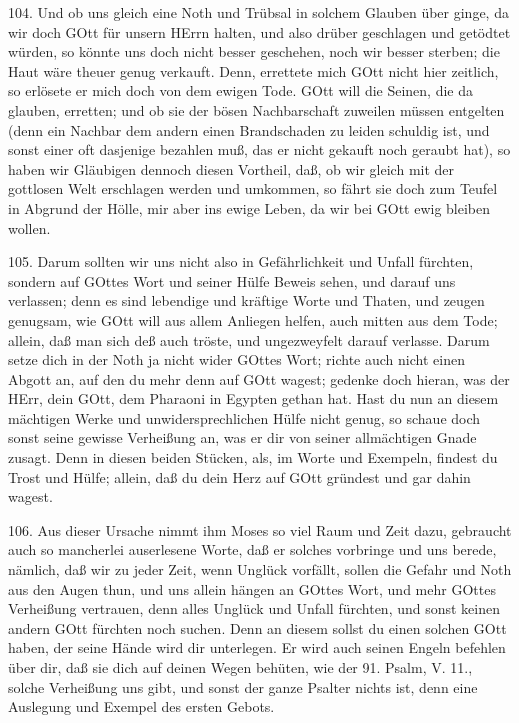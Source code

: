 104. Und ob uns gleich eine Noth und Trübsal in solchem Glauben über ginge, da wir doch GOtt für unsern HErrn halten, und also drüber geschlagen und getödtet würden, so könnte uns doch nicht besser geschehen, noch wir besser sterben; die Haut wäre theuer genug verkauft. Denn, errettete mich GOtt nicht hier zeitlich, so erlösete er mich doch von dem ewigen Tode. GOtt will die Seinen, die da glauben, erretten; und ob sie der bösen Nachbarschaft zuweilen müssen entgelten (denn ein Nachbar dem andern einen Brandschaden zu leiden schuldig ist, und sonst einer oft dasjenige bezahlen muß, das er nicht gekauft noch geraubt hat), so haben wir Gläubigen dennoch diesen Vortheil, daß, ob wir gleich mit der gottlosen Welt erschlagen werden und umkommen, so fährt sie doch zum Teufel in Abgrund der Hölle, mir aber ins ewige Leben, da wir bei GOtt ewig bleiben wollen.

105. Darum sollten wir uns nicht also in Gefährlichkeit und Unfall fürchten, sondern auf GOttes Wort und seiner Hülfe Beweis sehen, und darauf uns verlassen; denn es sind lebendige und kräftige Worte und Thaten, und zeugen genugsam, wie GOtt will aus allem Anliegen helfen, auch mitten aus dem Tode; allein, daß man sich deß auch tröste, und ungezweyfelt darauf verlasse. Darum setze dich in der Noth ja nicht wider GOttes Wort; richte auch nicht einen Abgott an, auf den du mehr denn auf GOtt wagest; gedenke doch hieran, was der HErr, dein GOtt, dem Pharaoni in Egypten gethan hat. Hast du nun an diesem mächtigen Werke und unwidersprechlichen Hülfe nicht genug, so schaue doch sonst seine gewisse Verheißung an, was er dir von seiner allmächtigen Gnade zusagt. Denn in diesen beiden Stücken, als, im Worte und Exempeln, findest du Trost und Hülfe; allein, daß du dein Herz auf GOtt gründest und gar dahin wagest.

106. Aus dieser Ursache nimmt ihm Moses so viel Raum und Zeit dazu, gebraucht auch so mancherlei auserlesene Worte, daß er solches vorbringe und uns berede, nämlich, daß wir zu jeder Zeit, wenn Unglück vorfällt, sollen die Gefahr und Noth aus den Augen thun, und uns allein hängen an GOttes Wort, und mehr GOttes Verheißung vertrauen, denn alles Unglück und Unfall fürchten, und sonst keinen andern GOtt fürchten noch suchen. Denn an diesem sollst du einen solchen GOtt haben, der seine Hände wird dir unterlegen. Er wird auch seinen Engeln befehlen über dir, daß sie dich auf deinen Wegen behüten, wie der 91. Psalm, V. 11., solche Verheißung uns gibt, und sonst der ganze Psalter nichts ist, denn eine Auslegung und Exempel des ersten Gebots.

